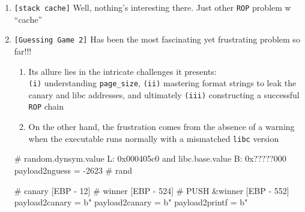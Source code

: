 \documentclass[main.tex]{subfiles}
\begin{document}
\begin{minipage}[t]{0.49\textwidth}
\begin{enumerate}
\begin{minipage}[t]{0.52\textwidth}
\begin{python}
				    return int.from_bytes(              pbytes, "big")
			\end{python}
		\end{minipage}
		
		\item[\texttt{[\_]}] \texttt{[stack cache]} Well, nothing’s interesting there. Just other \texttt{ROP} problem w ``cache''
		\item[\texttt{[\_]}] \texttt{[Guessing Game 2]} Has been the most fascinating yet frustrating problem so far!!!
		\setlength{\parskip}{0.4em}
		\begin{enumerate}[leftmargin=0pt, labelindent=0pt]
			\item[] Its allure lies in the intricate challenges it presents:\\ \texttt{(i)} understanding \texttt{page\_size}, \texttt{(ii)} mastering format strings to leak the canary and libc addresses, and ultimately \texttt{(iii)} constructing a successful \texttt{ROP} chain
			\item[] On the other hand, the frustration comes from the absence of a warning when the executable runs normally with a mismatched \texttt{libc} version
		\end{enumerate}
		\setlength{\parskip}{0.6em}
		\begin{python}
			# random.dynsym.value L: 0x000405c0 and libc.base.value B: 0x?????000 
			payload2nguess = -2623 # rand %
		\end{python}
		\begin{python}
			# canary [EBP - 12]  # winner [EBP - 524]  # PUSH &winner [EBP - 552]
			payload2canary = b"%
			payload2canary = b"%
			payload2printf = b"%
		\end{python}
	\end{enumerate}
\end{minipage}
\end{document}

